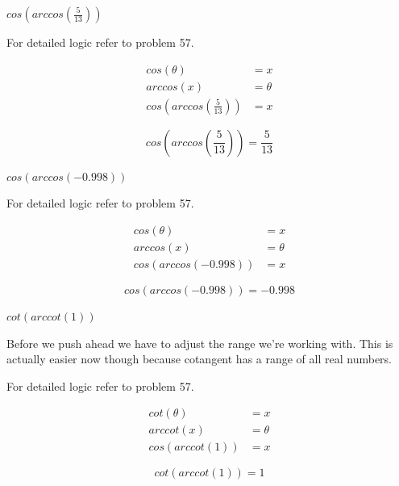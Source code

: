 \documentclass[10pt,letterpaper]{amspset}
\begin{document}
\begin{problem}[64]
    $cos \left(arccos \left( \frac{5}{13} \right)\right)$
\end{problem}

\begin{solution}
    For detailed logic refer to problem 57. 
    
    \begin{align}
        cos(\theta) &= x \\
        arccos(x) &= \theta \\
        cos \left(arccos \left( \frac{5}{13} \right)\right) &= x 
    \end{align}
    
    \[\boxed{ cos \left(arccos \left( \frac{5}{13} \right)\right) = \frac{5}{13} } \]
\end{solution}


\pagebreak


\begin{problem}[65]
    $cos \left(arccos \left( -0.998 \right)\right)$
\end{problem}

\begin{solution}
    For detailed logic refer to problem 57. 
    
    \begin{align}
        cos(\theta) &= x \\
        arccos(x) &= \theta \\
        cos \left(arccos \left( -0.998 \right)\right) &= x 
    \end{align}
    
    \[\boxed{ cos \left(arccos \left( -0.998 \right)\right) = -0.998 } \]
\end{solution}


\begin{problem}[72]
    $cot \left(arccot \left( 1 \right)\right)$
\end{problem}

\begin{solution}
    Before we push ahead we have to adjust the range we're working with. This is actually easier now though because cotangent has a range of all real numbers. 
    
    For detailed logic refer to problem 57. 
    
    \begin{align}
        cot(\theta) &= x \\
        arccot(x) &= \theta \\
        cos \left(arccot \left( 1 \right)\right) &= x 
    \end{align}
    
    \[\boxed{ cot \left(arccot \left( 1 \right)\right) = 1 } \]
\end{solution}
\end{document}
